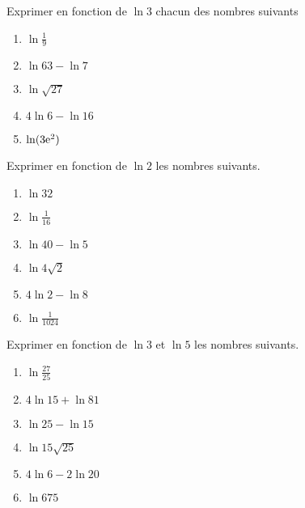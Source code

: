



 \summary{}
 
	\begin{exercice}
Exprimer en fonction de $ \ln 3 $ chacun des nombres suivants

\begin{enumerate}
\item $ \ln \frac{1}{9} $ 
\item $ \ln 63-\ln 7 $
\item  $ \ln \sqrt{27} $                                               
\item $ 4\ln 6-\ln 16  $
\item $ \ln(3\mathrm{e}^{2})  $
\end{enumerate}

  \end{exercice}
  
  \begin{exercice}
Exprimer en fonction de $ \ln 2 $  les nombres suivants.

\begin{enumerate}
\item $ \ln 32 $
\item $ \ln \frac{1}{16} $ 
\item $ \ln 40-\ln 5 $
\item  $ \ln 4\sqrt{2} $                                               
\item $ 4\ln 2-\ln 8  $
\item $ \ln \frac{1}{1024} $
\end{enumerate}


  \end{exercice}
  
  
 
   \begin{exercice}

Exprimer en fonction de $ \ln 3 $  et $ \ln 5 $ les nombres suivants.

\begin{enumerate}
\item $ \ln \frac{27}{25} $
\item $4\ln 15+\ln 81  $ 
\item $ \ln 25-\ln 15 $
\item  $ \ln 15\sqrt{25} $                                               
\item $ 4\ln6 -2\ln 20  $
\item $ \ln 675 $
\end{enumerate}

  \end{exercice}
  
